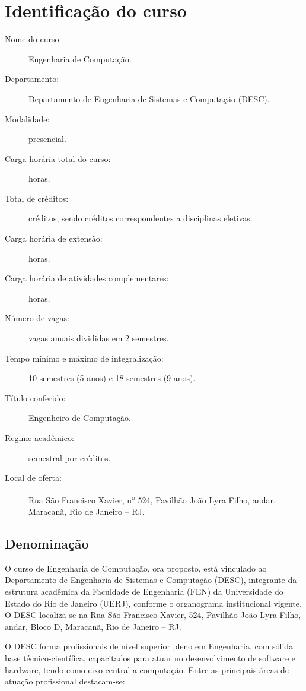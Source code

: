 \chapter{Identificação do curso}
\thispagestyle{plain}

\begin{description}
  \item [Nome do curso:] Engenharia de Computação.
  \item [Departamento:] Departamento de Engenharia de Sistemas e Computação (DESC).
  \item [Modalidade:] presencial.
  \item [Carga horária total do curso:] \tHorasCurso horas.
  \item [Total de créditos:] \tCredCurso créditos, sendo \credEletivas créditos correspondentes a disciplinas eletivas.
  \item [Carga horária de extensão:] \hExtensao horas.
  \item [Carga horária de atividades complementares:] \hACC horas.
  \item [Número de vagas:] \vagas vagas anuais divididas em 2 semestres.
  \item [Tempo mínimo e máximo de integralização:] 10 semestres (5 anos) e 18 semestres (9 anos).
  \item [Título conferido:] Engenheiro de Computação.
  \item [Regime acadêmico:] semestral por créditos.
  \item [Local de oferta:] Rua São Francisco Xavier, n\textsuperscript{o} 524, Pavilhão João Lyra Filho,  andar, Maracanã, Rio de Janeiro – RJ.
\end{description}
\section{Denominação}

O curso de Engenharia de Computação, ora proposto, está vinculado ao Departamento de Engenharia de Sistemas e Computação (DESC), integrante da estrutura acadêmica da Faculdade de Engenharia (FEN) da Universidade do Estado do Rio de Janeiro (UERJ), conforme o organograma institucional vigente. O DESC localiza-se na Rua São Francisco Xavier,  524, Pavilhão João Lyra Filho,  andar, Bloco D, Maracanã, Rio de Janeiro – RJ.

O DESC forma profissionais de nível superior pleno em Engenharia, com sólida base técnico-científica, capacitados para atuar no desenvolvimento de software e hardware, tendo como eixo central a computação. Entre as principais áreas de atuação profissional destacam-se:

